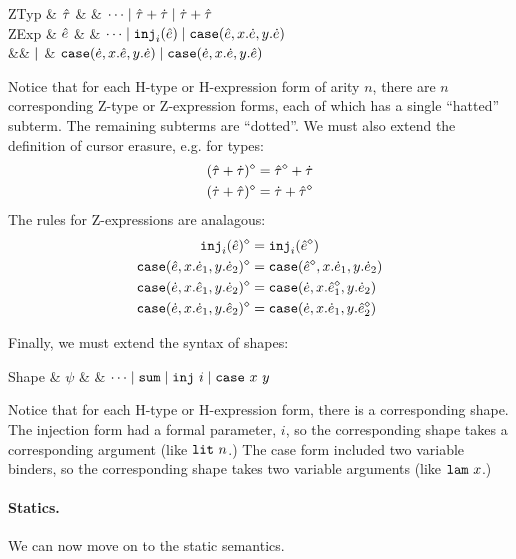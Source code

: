 \begin{grammar}
\textsf{ZTyp} & $\hat{\tau}$ & \bnfas & $\cdots \mathrel{\mid} {\hat{\tau}} + {\dot{\tau}} \mathrel{\mid} {\dot{\tau}} + {\hat{\tau}}$
\\
\textsf{ZExp} & $\hat{e}$ & \bnfas & $\cdots
\mathrel{\mid} \texttt{inj}_{i}({\hat{e}})
\mathrel{\mid} \texttt{case}({\hat{e}},{x}.{\dot{e}},{y}.{\dot{e}})$
\\
&& $\mathrel{\mid}$ & $\texttt{case}({\dot{e}},{x}.{\hat{e}},{y}.{\dot{e}})
\mathrel{\mid}\texttt{case}({\dot{e}},{x}.{\dot{e}},{y}.{\hat{e}})$
\end{grammar}
Notice that for each H-type or H-expression form of arity $n$, there are $n$ corresponding Z-type or Z-expression forms, each of which has a single ``hatted'' subterm. The remaining subterms are ``dotted''. We must also extend the definition of cursor erasure, e.g. for types:
\begin{align*}
(\hat{\tau} + \dot{\tau})^{\diamond} & = \hat{\tau}^{\diamond} + \dot{\tau}\\
(\dot{\tau} + \hat{\tau})^{\diamond} & = \dot{\tau} + \hat{\tau}^{\diamond}
\end{align*}
The rules for Z-expressions are analagous:
\begin{align*}
\texttt{inj}_{i}({\hat{e}})^{\diamond} & = \texttt{inj}_{i}({\hat{e}^{\diamond}})\\
\texttt{case}({\hat{e}},{x}.{\dot{e}_1},{y}.{\dot{e}_2})^{\diamond} & = \texttt{case}({\hat{e}^{\diamond}},{x}.{\dot{e}_1},{y}.{\dot{e}_2})\\
\texttt{case}({\dot{e}},{x}.{\hat{e}_1},{y}.{\dot{e}_2})^{\diamond} & = \texttt{case}({\dot{e}},{x}.{\hat{e}_1^{\diamond}},{y}.{\dot{e}_2})\\
\texttt{case}({\dot{e}},{x}.{\dot{e}_1},{y}.{\hat{e}_2})^{\diamond} & = \texttt{case}({\dot{e}},{x}.{\dot{e}_1},{y}.{\hat{e}_2^{\diamond}})
\end{align*}

Finally, we must extend the syntax of shapes:
\begin{grammar}
\textsf{Shape} & $\psi$ & \bnfas & $\cdots \mathrel{\mid} \mathtt{sum} \mathrel{\mid} \mathtt{inj}~i \mathrel{\mid} \mathtt{case}~x~y$
\end{grammar}
Notice that for each H-type or H-expression form, there is a corresponding shape. The injection form had a formal parameter, $i$, so the corresponding shape takes a corresponding argument (like $\mathtt{lit}~n$.) The case form included two variable binders, so the corresponding shape takes two variable arguments (like $\mathtt{lam}~x$.)



\paragraph{Statics.}
We can now move on to the static semantics.


